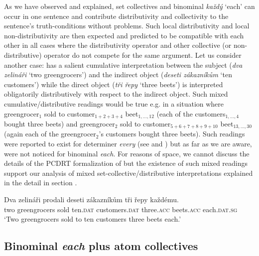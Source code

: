 \documentclass[output=paper,colorlinks,citecolor=brown,newtxmath]{langscibook}
\begin{document}
As we have observed and explained, set collectives and binominal \textit{každý} `each' can occur in one sentence and contribute distributivity and collectivity to the sentence's truth-conditions without problems. Such local distributivity and local non-distributivity are then expected and predicted to be compatible with each other in all cases where the distributivity operator and other collective (or non-distributive) operator do not compete for the same argument. Let us consider another case:  has a salient cumulative interpretation between the subject (\textit{dva zelináři} `two greengrocers') and the indirect object (\textit{deseti zákazníkům} `ten customers') while the direct object (\textit{tři řepy} `three beets') is interpreted obligatorily distributively with respect to the indirect object. Such mixed cumulative/distributive readings would be true e.g. in a situation where greengrocer$_1$ sold to customer$_{1+2+3+4}$ beet$_{1,\ldots,12}$ (each of the customers$_{1,\ldots,4}$ bought three beets) and green\-gro\-cer$_2$ sold to customer$_{5+6+7+8+9+10}$ beet$_{13,\ldots,30}$ (again each of the green\-gro\-cer$_2$'s customers bought three beets). Such readings were reported to exist for determiner \textit{every} (see \citealt{Kratzer2002} and \citealt{Brasoveanu2012}) but as far as we are aware, were not noticed for binominal \textit{each}. For reasons of space, we cannot discuss the details of the PCDRT formalization of  but the existence of such mixed readings support our analysis of mixed set-collective/distributive interpretations explained in the detail in section .

\ea\label{ex:line315}\gll Dva zelináři prodali deseti zákazníkům tři řepy každému.\\
two greengrocers sold ten.\textsc{dat} customers.\textsc{dat} three.\textsc{acc} beets.\textsc{acc} each.\textsc{dat.sg}\\
\glt `Two greengrocers sold to ten customers three beets each.'
\z

\subsection{Binominal \textit{each} plus atom collectives}\label{binominal-each-plus-atom-collective}
\end{document}
